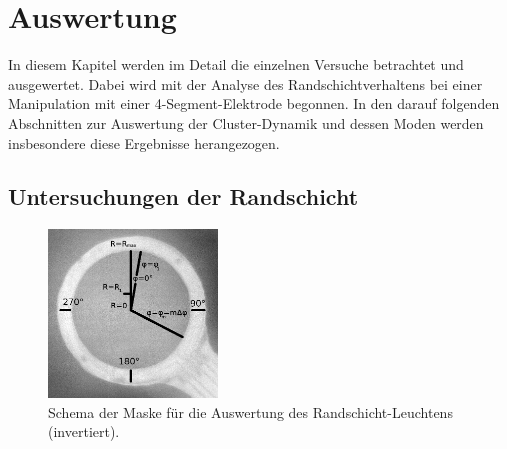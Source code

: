 \chapter{Auswertung}\label{sec:auswert}

  In diesem Kapitel werden im Detail die einzelnen Versuche betrachtet und ausgewertet. Dabei wird mit der Analyse des Randschichtverhaltens bei einer Manipulation mit einer 4-Segment-Elektrode begonnen. In den darauf folgenden Abschnitten zur Auswertung der Cluster-Dynamik und dessen Moden werden insbesondere diese Ergebnisse herangezogen.

      \section{Untersuchungen der Randschicht}\label{sub:glowanalys}

              \begin{figure}
                  \centering
                  \includegraphics[width=0.4\textwidth,height=0.4\textwidth]{figs/auswertung/plasmaglw/randanalysemaske.png}
                  \caption{Schema der Maske für die Auswertung des Randschicht-Leuchtens (invertiert).}
                  \label{img:randmaske}
              \end{figure}

